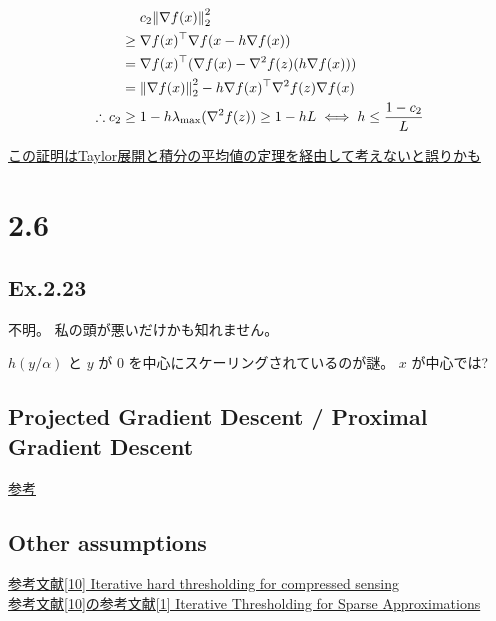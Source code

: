 \documentclass[a4paper, 14pt, dvipdfmx]{extarticle}
\begin{document}
\begin{align*}
                          & c_2 \norm{\nabla f(x)}_2^2                                                \\
    \geq{}                & \nabla f(x)^\top \nabla f(x-h \nabla f(x))                                \\
    ={}                   & \nabla f(x)^\top (\nabla f(x) - \nabla^2 f(z) (h \nabla f(x)))            \\
    ={}                   & \norm{\nabla f(x)}_2^2 - h \nabla f(x)^\top \nabla^2 f(z) \nabla f(x)     \\
    \therefore c_2 \geq{} & 1 - h \lambda_{\max}(\nabla^2 f(z)) \geq 1-hL \iff h \leq \frac{1-c_2}{L}
\end{align*}

\href{https://m-katsurada.sakura.ne.jp/lecture/tahensuu1-2011/tahensuu1-2011-16/node2.html}{この証明はTaylor展開と積分の平均値の定理を経由して考えないと誤りかも}

\section*{2.6}

\subsection*{Ex.2.23}

不明。 私の頭が悪いだけかも知れません。

\noindent
$h(y/\alpha)$ と $y$ が $0$ を中心にスケーリングされているのが謎。
$x$ が中心では?

\subsection*{Projected Gradient Descent / Proximal Gradient Descent}

\href{https://qiita.com/hari64/items/f05fea3f9142826c1031}{参考}

\subsection*{Other assumptions}

\href{https://www.sciencedirect.com/science/article/pii/S1063520309000384}{参考文献[10] Iterative hard thresholding for compressed sensing}\\
\href{https://link-springer-com.utokyo.idm.oclc.org/article/10.1007/s00041-008-9035-z}{参考文献[10]の参考文献[1] Iterative Thresholding for Sparse Approximations}
\end{document}
